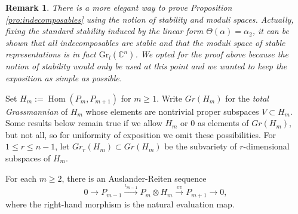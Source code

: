 \documentclass{amsart}
\newtheorem{remark}[theorem]{Remark}
\newcommand{\Gr}{\mathrm{Gr}}
\newcommand{\CC}{\mathbb{C}}
\newcommand{\Hom}{\operatorname{Hom}}
\begin{document}
\begin{remark}
  There is a more elegant way to prove Proposition \ref{pro:indecomposables} using the notion of stability and moduli spaces.
  Actually, fixing the standard stability induced by the linear form $\Theta(\alpha)=\alpha_2$, it can be shown that all indecomposables are stable and that the moduli space of stable representations is in fact $\Gr_l(\CC^n)$.
  We opted for the proof above because the notion of stability would only be used at this point and we wanted to keep the exposition as simple as possible. 
\end{remark}

Set $H_m:=\Hom(P_m,P_{m+1})$ for $m\ge1$. %
Write $Gr(H_m)$ for the \emph{total Grassmannian} of $H_m$ whose elements are nontrivial proper subspaces $V\subset H_m$.
Some results below remain true if we allow $H_m$ or $0$ as elements of $Gr(H_m)$, but not all, so for uniformity of exposition we omit these possibilities.
For $1\le r\le n-1$, let $Gr_r(H_m)\subset Gr(H_m)$ be the subvariety of $r$-dimensional subspaces of $H_m$.

For each $m\ge2$, there is an Auslander-Reiten sequence \cite[Section V]{ars}
\begin{equation}
  \label{eq:AR sequence}
  0\longrightarrow P_{m-1}\stackrel{\iota_{m-1}}{\longrightarrow} P_m\otimes H_m\stackrel{ev}{\longrightarrow} P_{m+1}\longrightarrow 0,
\end{equation}
where the right-hand morphism is the natural evaluation map.
\end{document}
